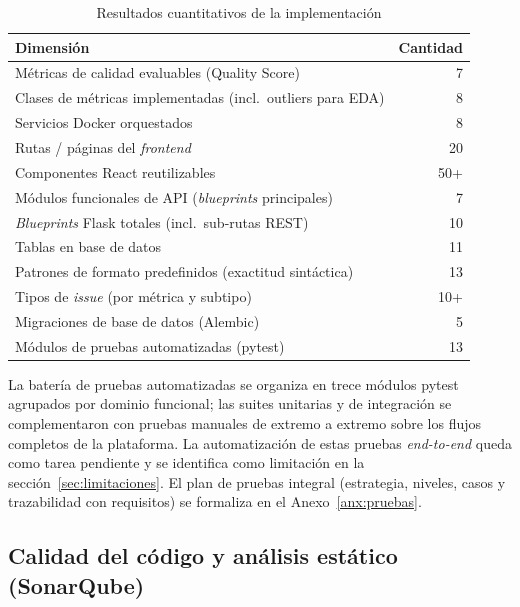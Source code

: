 \begin{table}[htbp]
  \centering
  \caption{Resultados cuantitativos de la implementación}
  \label{tab:resultados-cuantitativos}
  \begin{tabularx}{\textwidth}{X r}
    \toprule
    \textbf{Dimensión} & \textbf{Cantidad} \\
    \midrule
    Métricas de calidad evaluables (Quality Score) & 7     \\
    Clases de métricas implementadas (incl.\ outliers para \ac{EDA}) & 8 \\
    Servicios Docker orquestados                    & 8     \\
    Rutas / páginas del \emph{frontend}             & 20    \\
    Componentes React reutilizables                 & 50+   \\
    Módulos funcionales de \ac{API} (\emph{blueprints} principales) & 7 \\
    \emph{Blueprints} Flask totales (incl.\ sub-rutas \ac{REST})        & 10 \\
    Tablas en base de datos                         & 11    \\
    Patrones de formato predefinidos (exactitud sintáctica) & 13 \\
    Tipos de \emph{issue} (por métrica y subtipo)   & 10+   \\
    Migraciones de base de datos (Alembic)          & 5     \\
    Módulos de pruebas automatizadas (pytest)       & 13    \\
    \bottomrule
  \end{tabularx}
\end{table}

La batería de pruebas automatizadas se organiza en trece módulos pytest
agrupados por dominio funcional; las suites unitarias y de integración
se complementaron con pruebas manuales de extremo a extremo sobre los
flujos completos de la plataforma.  La automatización de estas pruebas
\emph{end-to-end} queda como tarea pendiente y se identifica como
limitación en la sección~\ref{sec:limitaciones}.  El plan de pruebas
integral (estrategia, niveles, casos y trazabilidad con requisitos) se
formaliza en el Anexo~\ref{anx:pruebas}.

\subsection{Calidad del código y análisis estático (SonarQube)}
\label{sec:calidad-sonarqube-resumen}

